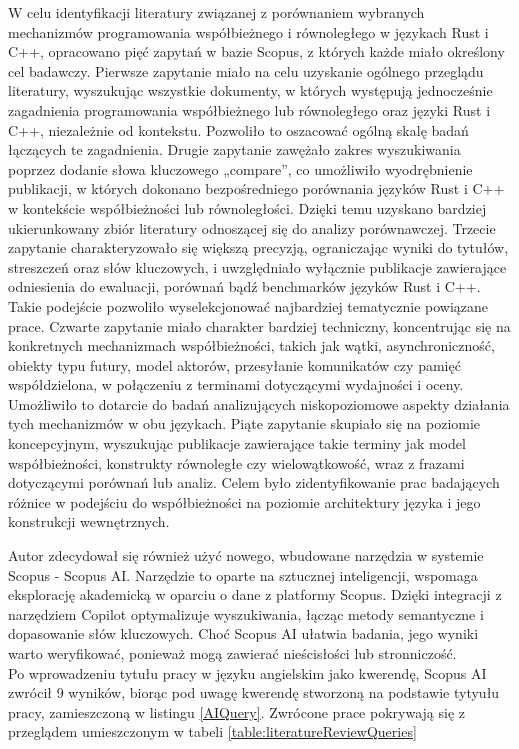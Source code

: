 W celu identyfikacji literatury związanej z porównaniem wybranych mechanizmów programowania współbieżnego i równoległego w językach Rust i C++, opracowano pięć zapytań w bazie Scopus, z których każde miało określony cel badawczy. Pierwsze zapytanie miało na celu uzyskanie ogólnego przeglądu literatury, wyszukując wszystkie dokumenty, w których występują jednocześnie zagadnienia programowania współbieżnego lub równoległego oraz języki Rust i C++, niezależnie od kontekstu. Pozwoliło to oszacować ogólną skalę badań łączących te zagadnienia. Drugie zapytanie zawężało zakres wyszukiwania poprzez dodanie słowa kluczowego „compare”, co umożliwiło wyodrębnienie publikacji, w których dokonano bezpośredniego porównania języków Rust i C++ w kontekście współbieżności lub równoległości. Dzięki temu uzyskano bardziej ukierunkowany zbiór literatury odnoszącej się do analizy porównawczej. Trzecie zapytanie charakteryzowało się większą precyzją, ograniczając wyniki do tytułów, streszczeń oraz słów kluczowych, i uwzględniało wyłącznie publikacje zawierające odniesienia do ewaluacji, porównań bądź benchmarków języków Rust i C++. Takie podejście pozwoliło wyselekcjonować najbardziej tematycznie powiązane prace. Czwarte zapytanie miało charakter bardziej techniczny, koncentrując się na konkretnych mechanizmach współbieżności, takich jak wątki, asynchroniczność, obiekty typu futury, model aktorów, przesyłanie komunikatów czy pamięć współdzielona, w połączeniu z terminami dotyczącymi wydajności i oceny. Umożliwiło to dotarcie do badań analizujących niskopoziomowe aspekty działania tych mechanizmów w obu językach. Piąte zapytanie skupiało się na poziomie koncepcyjnym, wyszukując publikacje zawierające takie terminy jak model współbieżności, konstrukty równoległe czy wielowątkowość, wraz z frazami dotyczącymi porównań lub analiz. Celem było zidentyfikowanie prac badających różnice w podejściu do współbieżności na poziomie architektury języka i jego konstrukcji wewnętrznych.

Autor zdecydował się również użyć nowego, wbudowane narzędzia w systemie Scopus - Scopus AI. Narzędzie to oparte na sztucznej inteligencji, wspomaga eksplorację akademicką w oparciu o dane z platformy Scopus. Dzięki integracji z narzędziem Copilot optymalizuje wyszukiwania, łącząc metody semantyczne i dopasowanie słów kluczowych. Choć Scopus AI ułatwia badania, jego wyniki warto weryfikować, ponieważ mogą zawierać nieścisłości lub stronniczość. \\
Po wprowadzeniu tytułu pracy w języku angielskim jako kwerendę, Scopus AI zwrócił 9 wyników, biorąc pod uwagę kwerendę stworzoną na podstawie tytyułu pracy, zamieszczoną w listingu \ref{AIQuery}. Zwrócone prace pokrywają się z przeglądem umieszczonym w tabeli \ref{table:literatureReviewQueries} 

